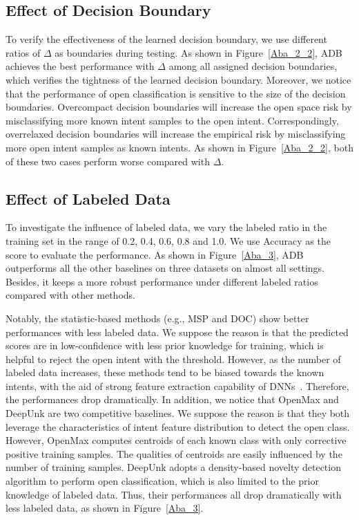 \documentclass[letterpaper]{article} %
\begin{document}
\subsection{Effect of Decision Boundary}
To verify the effectiveness of the learned decision boundary, we use different ratios of $\Delta$ as boundaries during testing. As shown in Figure~\ref{Aba_2_2}, ADB achieves the best performance with $\Delta$ among all assigned decision boundaries, which verifies the tightness of the learned decision boundary. Moreover, we notice that the performance of open classification is sensitive to the size of the decision boundaries. Overcompact decision boundaries will increase the open space risk by misclassifying more known intent samples to the open intent. Correspondingly, overrelaxed decision boundaries will increase the empirical risk by misclassifying more open intent samples as known intents. As shown in Figure~\ref{Aba_2_2}, both of these two cases perform worse compared with $\Delta$.

\subsection{Effect of Labeled Data}
To investigate the influence of labeled data, we vary the labeled ratio in the training set in the range of 0.2, 0.4, 0.6, 0.8 and 1.0. We use Accuracy as the score to evaluate the performance. As shown in Figure~\ref{Aba_3}, ADB outperforms all the other baselines on three datasets on almost all settings. Besides, it keeps a more robust performance under different labeled ratios compared with other methods.

Notably, the statistic-based methods (e.g., MSP and DOC) show better performances with less labeled data. We suppose the reason is that the predicted scores are in low-confidence with less prior knowledge for training, which is helpful to reject the open intent with the threshold. However, as the number of labeled data increases, these methods tend to be biased towards the known intents, with the aid of strong feature extraction capability of DNNs~\cite{7298640}. Therefore, the performances drop dramatically.  In addition, we notice that OpenMax and DeepUnk are two competitive baselines. We suppose the reason is that they both leverage the characteristics of intent feature distribution to detect the open class. However, OpenMax computes centroids of each known class with only corrective positive training samples. The qualities of centroids are easily influenced by the number of training samples. DeepUnk adopts a density-based novelty detection algorithm to perform open classification, which is also limited to the prior knowledge of labeled data. Thus, their performances all drop dramatically with less labeled data, as shown in Figure~\ref{Aba_3}.
\end{document}
